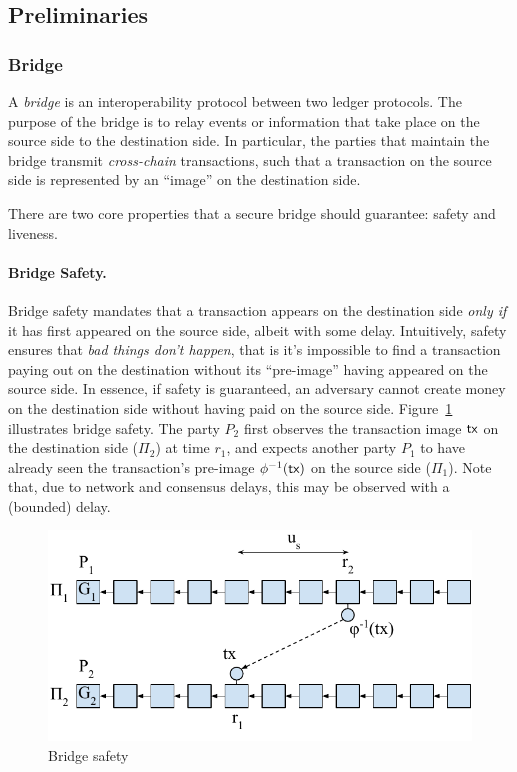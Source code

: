 \subsection{Preliminaries}

\subsubsection{Bridge}
A \emph{bridge} is an interoperability protocol between two ledger protocols.
The purpose of the bridge is to relay events or information that take place on
the source side to the destination side. In particular, the parties that
maintain the bridge transmit \emph{cross-chain} transactions, such that a
transaction on the source side is represented by an ``image'' on the
destination side.

There are two core properties that a secure bridge should guarantee: safety and
liveness.

\paragraph{Bridge Safety.}
Bridge safety mandates that a transaction appears on the destination side \emph{only if} it has first
appeared on the source side, albeit with some delay.
%
Intuitively, safety ensures that \emph{bad
things don't happen}, that is it's impossible to find a transaction paying out on the
destination without its ``pre-image'' having appeared on the source side. 
In essence, if safety is guaranteed, an adversary cannot create money on the
destination side without having paid on the source side.
%
Figure~\ref{fig:bridge-safety} illustrates bridge safety.
The party $P_2$ first observes the transaction image $\textsf{tx}$ on the destination
side ($\Pi_2$) at time $r_1$, and expects another party $P_1$ to have already
seen the transaction's pre-image $\phi^{-1}(\textsf{tx})$ on the source side ($\Pi_1$).
Note that, due to network and consensus delays, this may be observed with a
(bounded) delay.

\begin{figure}
    \center
    \includegraphics[width=0.8\columnwidth]{figures/bridge-safety.pdf}
    \caption{Bridge safety}
    \label{fig:bridge-safety}
\end{figure}

